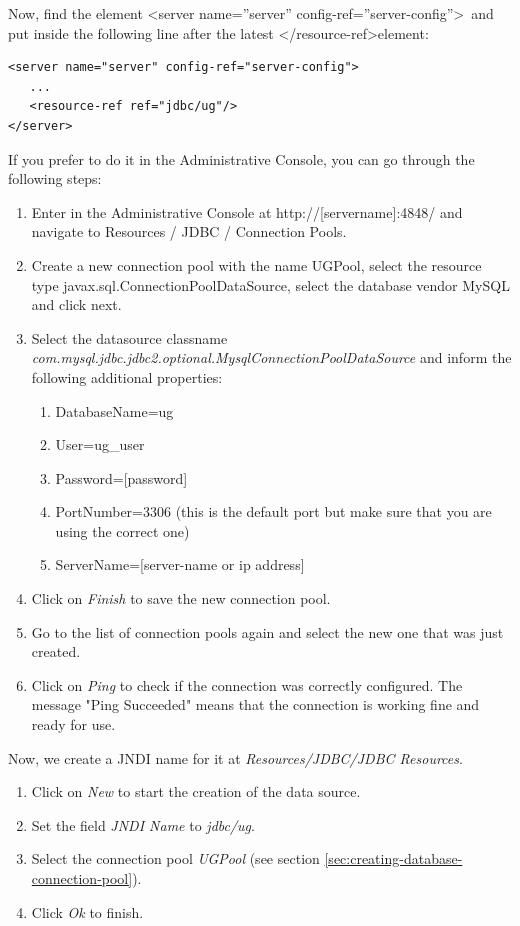 \documentclass[envcountsame,envcountchap]{svmono}
\begin{document}
Now, find the element \textless server name=''server'' config-ref=''server-config''\textgreater \ and put inside the following line after the latest \textless /resource-ref\textgreater element:

\begin{verbatim}
<server name="server" config-ref="server-config">
   ...
   <resource-ref ref="jdbc/ug"/>
</server>
\end{verbatim}

If you prefer to do it in the Administrative Console, you can go through the following steps:

\begin{enumerate}
\item  Enter in the Administrative Console at http://[servername]:4848/ and navigate to Resources / JDBC / Connection Pools.
\item Create a new connection pool with the name UGPool, select the resource type javax.sql.ConnectionPoolDataSource, select the database vendor MySQL and click next.
\item Select the datasource classname \\ \textit{com.mysql.jdbc.jdbc2.optional.MysqlConnectionPoolDataSource} and inform the following additional properties:
   \begin{enumerate}
   \item DatabaseName=ug
   \item User=ug\_user
   \item Password=[password]
   \item PortNumber=3306 (this is the default port but make sure
   that you are using the correct one)
   \item ServerName=[server-name or ip address]
   \end{enumerate}
\item Click on \textit{Finish} to save the new connection pool.
\item Go to the list of connection pools again and select the new one that was just created.
\item Click on \textit{Ping} to check if the connection was correctly configured. The message "Ping Succeeded" means that the connection is working fine and ready for use.
\end{enumerate}

Now, we create a JNDI name for it at \textit{Resources/JDBC/JDBC Resources}.

\begin{enumerate}
\item Click on \textit{New} to start the creation of the data source.
\item Set the field \textit{JNDI Name} to \textit{jdbc/ug}.
\item Select the connection pool \textit{UGPool} (see section \ref{sec:creating-database-connection-pool}).
\item Click \textit{Ok} to finish.
\end{enumerate}
\end{document}

